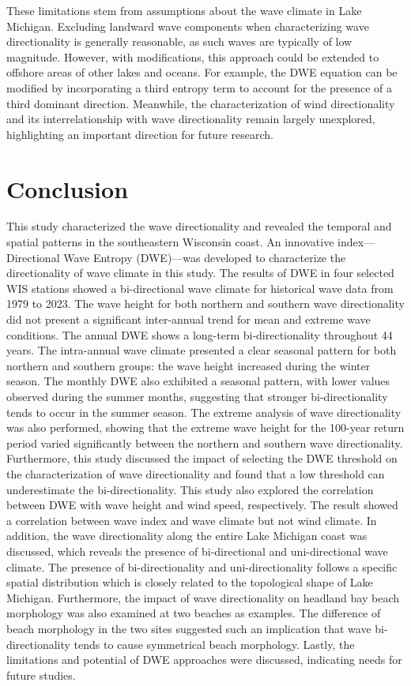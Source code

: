 These limitations stem from assumptions about the wave climate in Lake Michigan.
Excluding landward wave components when characterizing wave directionality is
generally reasonable, as such waves are typically of low magnitude. However,
with modifications, this approach could be extended to offshore areas of other
lakes and oceans. For example, the DWE equation can be modified by incorporating
a third entropy term to account for the presence of a third dominant direction.
Meanwhile, the characterization of wind directionality and its interrelationship
with wave directionality remain largely unexplored, highlighting an important
direction for future research.

\section{Conclusion}
\label{c3_Conclusion}

This study characterized the wave directionality and revealed the temporal and
spatial patterns in the southeastern Wisconsin coast. An innovative
index—Directional Wave Entropy (DWE)—was developed to characterize the
directionality of wave climate in this study. The results of DWE in four
selected WIS stations showed a bi-directional wave climate for historical wave
data from 1979 to 2023. The wave height for both northern and southern wave
directionality did not present a significant inter-annual trend for mean and
extreme wave conditions. The annual DWE shows a long-term bi-directionality
throughout 44 years. The intra-annual wave climate presented a clear seasonal
pattern for both northern and southern groups: the wave height increased during
the winter season. The monthly DWE also exhibited a seasonal pattern, with lower
values observed during the summer months, suggesting that stronger
bi-directionality tends to occur in the summer season. The extreme analysis of
wave directionality was also performed, showing that the extreme wave height for
the 100-year return period varied significantly between the northern and
southern wave directionality. Furthermore, this study discussed the impact of
selecting the DWE threshold on the characterization of wave directionality and
found that a low threshold can underestimate the bi-directionality. This study
also explored the correlation between DWE with wave height and wind speed,
respectively. The result showed a correlation between wave index and wave
climate but not wind climate. In addition, the wave directionality along the
entire Lake Michigan coast was discussed, which reveals the presence of
bi-directional and uni-directional wave climate. The presence of
bi-directionality and uni-directionality follows a specific spatial distribution
which is closely related to the topological shape of Lake Michigan. Furthermore,
the impact of wave directionality on headland bay beach morphology was also
examined at two beaches as examples. The difference of beach morphology in the
two sites suggested such an implication that wave bi-directionality tends to
cause symmetrical beach morphology. Lastly, the limitations and potential of DWE
approaches were discussed, indicating needs for future studies.